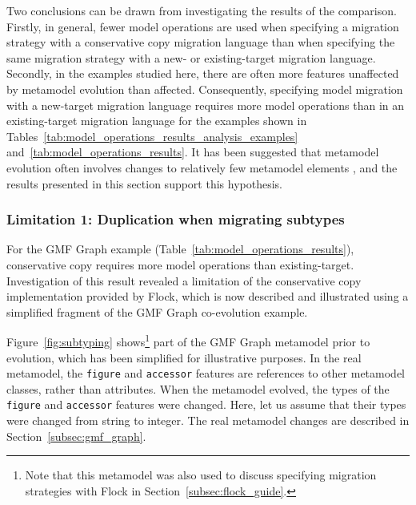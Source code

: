 Two conclusions can be drawn from investigating the results of the comparison. Firstly, in general, fewer model operations are used when specifying a migration strategy with a conservative copy migration language than when specifying the same migration strategy with a new- or existing-target migration language. Secondly, in the examples studied here, there are often more features unaffected by metamodel evolution than affected. Consequently, specifying model migration with a new-target migration language requires more model operations than in an existing-target migration language for the examples shown in Tables~\ref{tab:model_operations_results_analysis_examples} and~\ref{tab:model_operations_results}. It \cc has been suggested that metamodel evolution often involves changes to relatively few metamodel elements \cite{sprinkle03thesis}, and the results presented in this section support this hypothesis.  


\subsubsection{Limitation 1: Duplication when migrating subtypes}
For the GMF Graph example (Table~\ref{tab:model_operations_results}), conservative copy requires more model operations than existing-target. Investigation of this result revealed a limitation of the conservative copy implementation provided by Flock, which is now described and illustrated using a simplified fragment of the GMF Graph co-evolution example.

Figure~\ref{fig:subtyping} shows\footnote{Note that this metamodel was also used to discuss specifying migration strategies with Flock in Section~\ref{subsec:flock_guide}.} part of the GMF Graph metamodel prior to evolution, which has been simplified for illustrative purposes. In the real metamodel, the \texttt{figure} and \texttt{accessor} features are references to other metamodel classes, rather than attributes. When the metamodel evolved, the types of the \texttt{figure} and \texttt{accessor} features were changed. Here, let us assume that their types were changed from string to integer. The real metamodel changes are described in Section~\ref{subsec:gmf_graph}.


